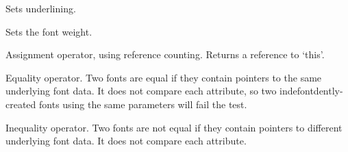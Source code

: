 


\label{wxfontsetunderlined}


Sets underlining.





\label{wxfontsetweight}


Sets the font weight.





\label{wxfontassignment}


Assignment operator, using reference counting. Returns a reference
to `this'.

\label{wxfontequals}


Equality operator. Two fonts are equal if they contain pointers
to the same underlying font data. It does not compare each attribute,
so two indefontdently-created fonts using the same parameters will
fail the test.

\label{wxfontnotequals}


Inequality operator. Two fonts are not equal if they contain pointers
to different underlying font data. It does not compare each attribute.


